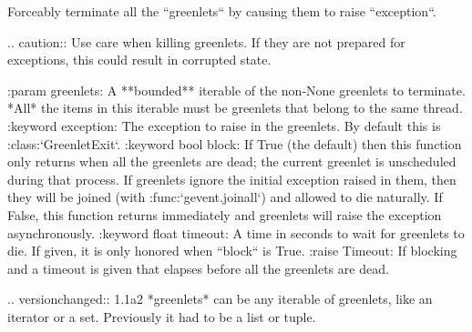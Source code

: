\begin{DoxyVerb}Forceably terminate all the ``greenlets`` by causing them to raise ``exception``.

.. caution:: Use care when killing greenlets. If they are not prepared for exceptions,
   this could result in corrupted state.

:param greenlets: A **bounded** iterable of the non-None greenlets to terminate.
   *All* the items in this iterable must be greenlets that belong to the same thread.
:keyword exception: The exception to raise in the greenlets. By default this is
    :class:`GreenletExit`.
:keyword bool block: If True (the default) then this function only returns when all the
    greenlets are dead; the current greenlet is unscheduled during that process.
    If greenlets ignore the initial exception raised in them,
    then they will be joined (with :func:`gevent.joinall`) and allowed to die naturally.
    If False, this function returns immediately and greenlets will raise
    the exception asynchronously.
:keyword float timeout: A time in seconds to wait for greenlets to die. If given, it is
    only honored when ``block`` is True.
:raise Timeout: If blocking and a timeout is given that elapses before
    all the greenlets are dead.

.. versionchanged:: 1.1a2
    *greenlets* can be any iterable of greenlets, like an iterator or a set.
    Previously it had to be a list or tuple.
\end{DoxyVerb}
 